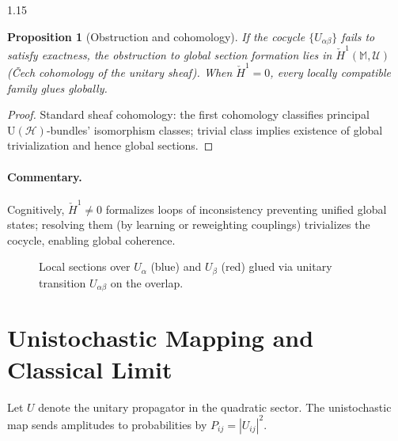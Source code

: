 \documentclass[12pt,a4paper]{article}
\numberwithin{equation}{section}
\theoremstyle{definition}
\theoremstyle{plain}
\newtheorem{proposition}{Proposition}[section]
\theoremstyle{remark}
\newcommand{\M}{\mathbb{M}}
\begin{document}
\begin{spacing}{1.15}
\begin{proposition}[Obstruction and cohomology]\label{prop:cech}
If the cocycle $\{U_{\alpha\beta}\}$ fails to satisfy exactness, the obstruction to global section formation lies in $\check{H}^1(\M,\mathcal{U})$ (Čech cohomology of the unitary sheaf). When $\check{H}^1=0$, every locally compatible family glues globally.
\end{proposition}
\begin{proof}
Standard sheaf cohomology: the first cohomology classifies principal $\mathrm{U}(\mathcal{H})$-bundles' isomorphism classes; trivial class implies existence of global trivialization and hence global sections.
\end{proof}

\paragraph{Commentary.}
Cognitively, $\check{H}^1\neq 0$ formalizes loops of inconsistency preventing unified global states; resolving them (by learning or reweighting couplings) trivializes the cocycle, enabling global coherence.

\begin{figure}[H]
\centering
{}
\caption{Local sections over $U_\alpha$ (blue) and $U_\beta$ (red) glued via unitary transition $U_{\alpha\beta}$ on the overlap.}
\label{fig:gluing}
\end{figure}

\section{Unistochastic Mapping and Classical Limit}\label{sec:unistochastic}
Let $U$ denote the unitary propagator in the quadratic sector. The unistochastic map sends amplitudes to probabilities by $P_{ij}=|U_{ij}|^2$.


\end{spacing}
\end{document}
